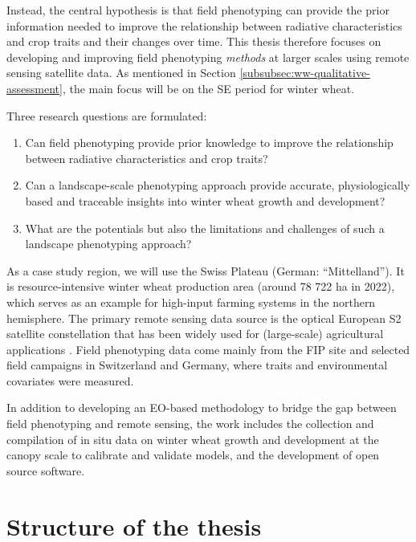 Instead, the central hypothesis is that field phenotyping can provide the prior information needed to improve the relationship between radiative characteristics and crop traits and their changes over time. This thesis therefore focuses on developing and improving field phenotyping \textsl{methods} at larger scales using remote sensing satellite data. As mentioned in Section \ref{subsubsec:ww-qualitative-assessment}, the main focus will be on the \gls{SE} period for winter wheat.

Three research questions are formulated:

\begin{enumerate}
    \item Can field phenotyping provide prior knowledge to improve the relationship between radiative characteristics and crop traits?
    \item Can a landscape-scale phenotyping approach provide accurate, physiologically based and traceable insights into winter wheat growth and development?
    \item What are the potentials but also the limitations and challenges of such a landscape phenotyping approach?
\end{enumerate}

As a case study region, we will use the Swiss Plateau (German: ``Mittelland''). It is resource-intensive winter wheat production area (around 78 722 ha in 2022), which serves as an example for high-input farming systems in the northern hemisphere. The primary remote sensing data source is the optical European \gls{S2} satellite constellation that has been widely used for (large-scale) agricultural applications \citep{frampton_evaluating_2013,  veloso_understanding_2017, clevers_using_2017, perich_pixel-based_2023}. Field phenotyping data come mainly from the FIP site \citep{kirchgessner_eth_2017} and selected field campaigns in Switzerland and Germany, where traits and environmental covariates were measured.

In addition to developing an \gls{EO}-based methodology to bridge the gap between field phenotyping and remote sensing, the work includes the collection and compilation of in situ data on winter wheat growth and development at the canopy scale to calibrate and validate models, and the development of open source software.

\section{Structure of the thesis}

